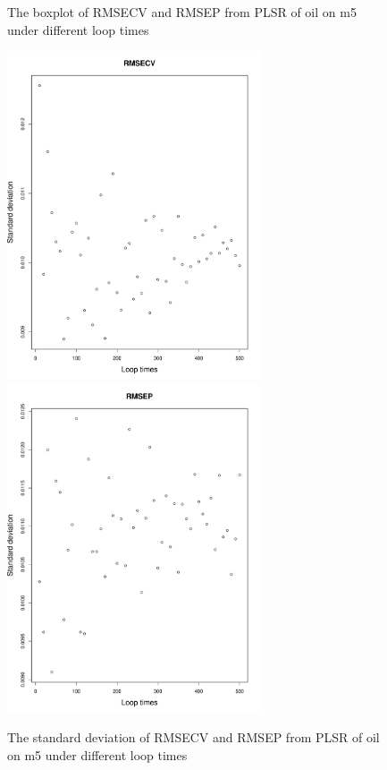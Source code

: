 \documentclass[a4paper,12pt,titlepage]{article} %
\numberwithin{equation}{section}  %
\begin{document}
\begin{figure}[h]
		\vspace*{-0.25cm}    %
		\caption{The boxplot of RMSECV and RMSEP from PLSR of oil on m5 under different loop times}          %
		\label{fig:sd_RMSECV_RMSEP}               %
	\end{figure}                        %
	
\begin{figure}[h]    %
	\centering           %
	\includegraphics[width=7.5cm, angle=0]{sd_RMSECV_loop_times_500.pdf}  %
	\includegraphics[width=7.5cm, angle=0]{sd_RMSEP_loop_times_500.pdf} %
	\vspace*{-0.25cm}    %
	\caption{The standard deviation of RMSECV and RMSEP from PLSR of oil on m5 under different loop times}          %
	\label{fig:sd_RMSECV_RMSEP}               %
\end{figure}                        %
	
\end{document}
